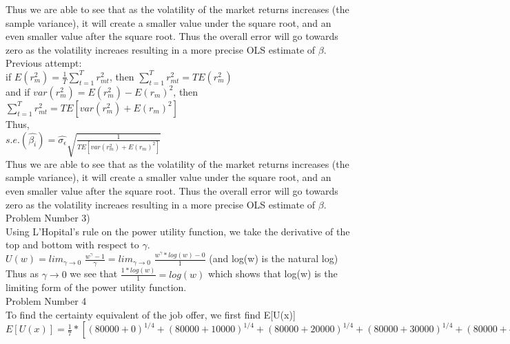 \documentclass[11pt]{article}
\begin{document}
Thus we are able to see that as the volatility of the market returns increases (the sample variance), it will create a smaller value under the square root, and an even smaller value after the square root. Thus the overall error will go towards zero as the volatility increaes resulting in a more precise OLS estimate of $\beta$.\\

Previous attempt:\\
if $E(r_{m}^{2}) = \frac{1}{T} \sum_{t = 1}^{T} r_{mt}^{2}$, then $\sum_{t = 1}^{T} r_{mt}^{2} = T E(r_{m}^{2})$\\
and if $var(r_{m}^{2}) = E(r_{m}^{2}) - E(r_{m})^{2}$, then $\sum_{t = 1}^{T} r_{mt}^{2} = T E[var(r_{m}^{2}) + E(r_{m})^{2}]$\\
Thus,\\
$s.e.(\hat{\beta_{i}}) = \hat{\sigma_{\epsilon}} \sqrt{\frac{1}{T E[var(r_{m}^{2}) + E(r_{m})^{2}]}}$\\

Thus we are able to see that as the volatility of the market returns increases (the sample variance), it will create a smaller value under the square root, and an even smaller value after the square root. Thus the overall error will go towards zero as the volatility increaes resulting in a more precise OLS estimate of $\beta$.\\

Problem Number 3)\\
Using L'Hopital's rule on the power utility function, we take the derivative of the top and bottom with respect to $\gamma$.\\

$U(w) = lim_{\gamma \rightarrow 0}$ $\frac{w^{\gamma}-1}{\gamma} = lim_{\gamma \rightarrow 0}$ $\frac{w ^{\gamma}*log(w) - 0}{1}$ (and log(w) is the natural log)\\
Thus as $\gamma \rightarrow 0$ we see that $\frac{1*log(w)}{1} = log(w)$ which shows that log(w) is the limiting form of the power utility function.\\

Problem Number 4\\
To find the certainty equivalent of the job offer, we first find E[U(x)]\\

$E[U(x)] = \frac{1}{7}*[(80000+0)^{1/4}+(80000+10000)^{1/4}+(80000+20000)^{1/4}+(80000+30000)^{1/4}+(80000+40000)^{1/4}+(80000+50000)^{1/4}+(80000+60000)^{1/4}] = 18.15380$\\
\end{document}
